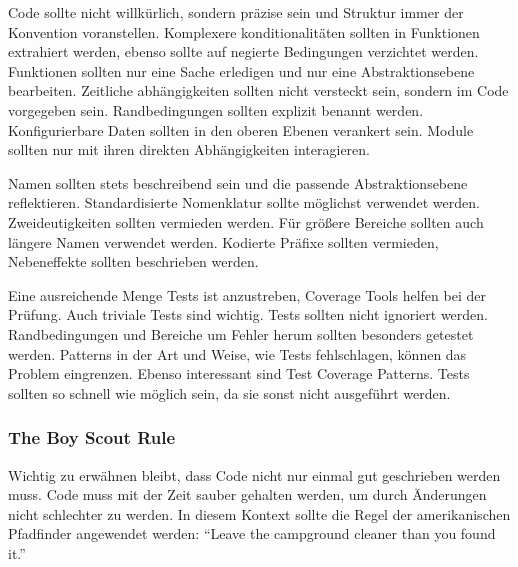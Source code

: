 Code sollte nicht willkürlich, sondern präzise sein und Struktur immer der Konvention voranstellen.
Komplexere konditionalitäten sollten in Funktionen extrahiert werden, ebenso sollte auf negierte Bedingungen verzichtet werden.
Funktionen sollten nur eine Sache erledigen und nur eine Abstraktionsebene bearbeiten.
Zeitliche abhängigkeiten sollten nicht versteckt sein, sondern im Code vorgegeben sein.
Randbedingungen sollten explizit benannt werden.
Konfigurierbare Daten sollten in den oberen Ebenen verankert sein.
Module sollten nur mit ihren direkten Abhängigkeiten interagieren.

Namen sollten stets beschreibend sein und die passende Abstraktionsebene reflektieren.
Standardisierte Nomenklatur sollte möglichst verwendet werden.
Zweideutigkeiten sollten vermieden werden.
Für größere Bereiche sollten auch längere Namen verwendet werden.
Kodierte Präfixe sollten vermieden, Nebeneffekte sollten beschrieben werden.

Eine ausreichende Menge Tests ist anzustreben, Coverage Tools helfen bei der Prüfung.
Auch triviale Tests sind wichtig.
Tests sollten nicht ignoriert werden.
Randbedingungen und Bereiche um Fehler herum sollten besonders getestet werden.
Patterns in der Art und Weise, wie Tests fehlschlagen, können das Problem eingrenzen.
Ebenso interessant sind Test Coverage Patterns.
Tests sollten so schnell wie möglich sein, da sie sonst nicht ausgeführt werden.

\subsubsection{The Boy Scout Rule}
Wichtig zu erwähnen bleibt, dass Code nicht nur einmal gut geschrieben werden muss.
Code muss mit der Zeit sauber gehalten werden, um durch Änderungen nicht schlechter zu werden.
In diesem Kontext sollte die Regel der amerikanischen Pfadfinder angewendet werden:
\enquote{Leave the campground cleaner than you found it.}~\cite{clean-code}
